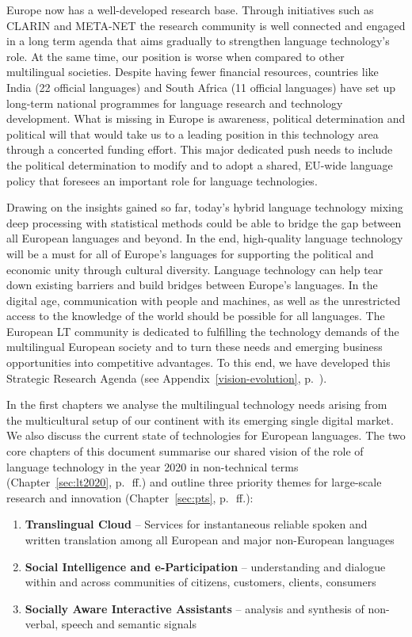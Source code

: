 \documentclass[10pt, plain]{../../metanetpaper}
\begin{document}
\begin{multicols}{2}
Europe now has a well-developed research base. Through initiatives such as CLARIN and META-NET the research community is well connected and engaged in a long term agenda that aims gradually to strengthen language technology's role. At the same time, our position is worse when compared to other multilingual societies. Despite having fewer financial resources, countries like India (22 official languages) and South Africa (11 official languages) have set up long-term national programmes for language research and technology development. What is missing in Europe is awareness, political determination and political will that would take us to a leading position in this technology area through a concerted funding effort. This major dedicated push needs to include the political determination to modify and to adopt a shared, EU-wide language policy that foresees an important role for language technologies. 

Drawing on the insights gained so far, today’s hybrid language technology mixing deep processing with statistical methods could be able to bridge the gap between all European languages and beyond. In the end, high-quality language technology will be a must for all of Europe's languages for supporting the political and economic unity through cultural diversity. Language technology can help tear down existing barriers and build bridges between Europe’s languages. In the digital age, communication with people and machines, as well as the unrestricted access to the knowledge of the world should be possible for all languages. The European LT community is dedicated to fulfilling the technology demands of the multilingual European society and to turn these needs and emerging business opportunities into competitive advantages. To this end, we have developed this Strategic Research Agenda (see Appendix~\ref{vision-evolution}, p.~\pageref{vision-evolution}).

In the first chapters we analyse the multilingual technology needs arising from the multicultural setup of our continent with its emerging single digital market. We also discuss the current state of technologies for European languages. The two core chapters of this document summarise our shared vision of the role of language technology in the year 2020 in non-technical terms (Chapter~\ref{sec:lt2020}, p.~\pageref{sec:lt2020}\,ff.) and outline three priority themes for large-scale research and innovation (Chapter~\ref{sec:pts}, p.~\pageref{sec:pts}\,ff.):

\begin{enumerate}
\item \textbf{Translingual Cloud} -- Services for instantaneous reliable spoken and written translation among all European and major non-European languages
\item \textbf{Social Intelligence and e-Participation} -- understanding and dialogue within and across communities of citizens, customers, clients, consumers
\item \textbf{Socially Aware Interactive Assistants} -- analysis and synthesis of non-verbal, speech and semantic signals
\end{enumerate}
 

\end{multicols}
\end{document}
